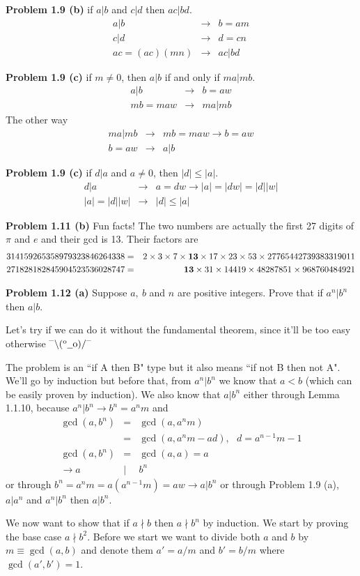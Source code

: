 \documentclass[aps,preprint,preprintnumbers,nofootinbib,showpacs,prd]{revtex4-1}
\newcommand{\nbea}{\begin{eqnarray*}}
\newcommand{\neea}{\end{eqnarray*}}
\newcommand{\dunno}{$ {}^{\mbox {--}}\backslash(^{\rm o}{}\underline{\hspace{0.2cm}}{\rm o})/^{\mbox {--}}$}
\begin{document}
{\bf Problem 1.9 (b)} if $a|b$ and $c|d$ then $ac|bd$.
%
\nbea
a|b & \to & b = a m \\
c|d & \to & d = c n \\
ac = (ac)(mn) & \to & ac|bd
\neea
%

{\bf Problem 1.9 (c)} if $m \neq 0$, then $a|b$ if and only if $ma|mb$.
%
\nbea
a|b & \to & b = a w \\
mb = ma w & \to & ma |mb
\neea
%
The other way
%
\nbea
ma|mb & \to & mb = ma w \to b = aw  \\
b = a w & \to & a | b
\neea
%

{\bf Problem 1.9 (c)} if $d | a$ and $a \neq 0$, then $|d| \le |a|$.
%
\nbea
d|a & \to & a = d w \to |a| = |d w| = |d| |w| \\
|a| = |d| |w| & \to & |d| \le |a|
\neea
%

{\bf Problem 1.11 (b)} Fun facts! The two numbers are actually the first 27 digits of $\pi$ and $e$ and their gcd is 13. Their factors are
%
\nbea
314159265358979323846264338 & = & 2 \times 3 \times 7 \times {\bf 13} \times 17 \times 23 \times 53 \times 27765442739383319011 \\
271828182845904523536028747 & = & {\bf 13} \times 31 \times 14419 \times 48287851 \times 968760484921
\neea
%

{\bf Problem 1.12 (a)} Suppose $a,~b$ and $n$ are positive integers. Prove that if $a^n | b^n$ then $a|b$.

Let's try if we can do it without the fundamental theorem, since it'll be too easy otherwise \dunno

The problem is an ``if A then B" type but it also means ``if not B then not A". We'll go by induction but before that, from $a^n | b^n$ we know that $a < b$ (which can be easily proven by induction). We also know that $a|b^n$ either through Lemma 1.1.10, because $a^n|b^n \to b^n = a^n m$ and
%
\nbea
\gcd(a,b^n) & = & \gcd(a, a^n m)\\
& = & \gcd(a, a^n m - ad), ~~~ d = a^{n-1}m - 1 \\
\gcd(a,b^n) & = & \gcd(a, a) = a \\
\to a & | & b^n
\neea
%
or through $b^n = a^n m = a (a^{n-1}m) = a w \to a|b^n$ or through Problem 1.9 (a), $a|a^n$ and $a^n|b^n$ then $a|b^n$.

We now want to show that if $a \nmid b$ then $a \nmid b^n$ by induction. We start by proving the base case $a \nmid b^2$. Before we start we want to divide both $a$ and $b$ by $m \equiv \gcd(a,b)$ and denote them $a' = a/m$ and $b'=b/m$ where $\gcd(a',b') = 1$.
\end{document}
